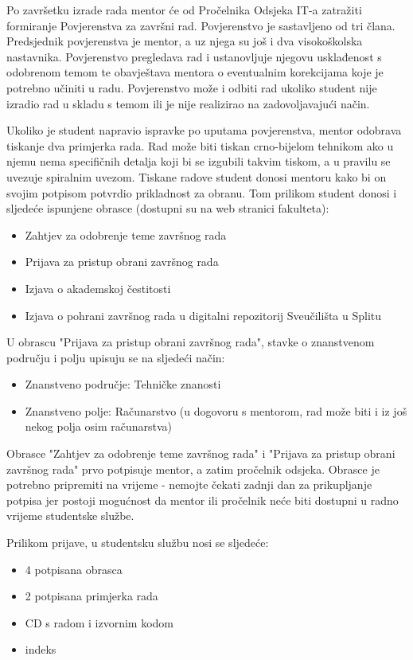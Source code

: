 Po završetku izrade rada mentor će od Pročelnika Odsjeka IT-a zatražiti formiranje Povjerenstva za završni rad. Povjerenstvo je sastavljeno od tri člana. Predsjednik povjerenstva je mentor, a uz njega su još i dva visokoškolska nastavnika. Povjerenstvo pregledava rad i ustanovljuje njegovu usklađenost s odobrenom temom te obavještava mentora o eventualnim korekcijama koje je potrebno učiniti u radu. Povjerenstvo može i odbiti rad ukoliko student nije izradio rad u skladu s temom ili je nije realizirao na zadovoljavajući način.

Ukoliko je student napravio ispravke po uputama povjerenstva, mentor odobrava tiskanje dva primjerka rada. Rad može biti tiskan crno-bijelom tehnikom ako u njemu nema specifičnih detalja koji bi se izgubili takvim tiskom, a u pravilu se uvezuje spiralnim uvezom. Tiskane radove student donosi mentoru kako bi on svojim potpisom potvrdio prikladnost za obranu. Tom prilikom  student donosi i sljedeće ispunjene obrasce (dostupni su na web stranici fakulteta):

\begin{itemize}
	\item Zahtjev za odobrenje teme završnog rada
	\item Prijava za pristup obrani završnog rada
	\item Izjava o akademskoj čestitosti
	\item Izjava o pohrani završnog rada u digitalni repozitorij Sveučilišta u Splitu 
\end{itemize}

U obrascu "Prijava za pristup obrani završnog rada", stavke o znanstvenom području i polju upisuju se na sljedeći način:
\begin{itemize}
	\item Znanstveno područje: Tehničke znanosti
	\item Znanstveno polje: Računarstvo (u dogovoru s mentorom, rad može biti i iz još nekog polja osim računarstva)
\end{itemize}

Obrasce "Zahtjev za odobrenje teme završnog rada" i "Prijava za pristup obrani završnog rada" prvo potpisuje mentor, a zatim pročelnik odsjeka. Obrasce je potrebno pripremiti na vrijeme - nemojte čekati zadnji dan za prikupljanje potpisa jer postoji mogućnost da mentor ili pročelnik neće biti dostupni u radno vrijeme studentske službe.

Prilikom prijave, u studentsku službu nosi se sljedeće:
\begin{itemize}
	\item 4 potpisana obrasca
	\item 2 potpisana primjerka rada
	\item CD s radom i izvornim kodom
	\item indeks
\end{itemize}

